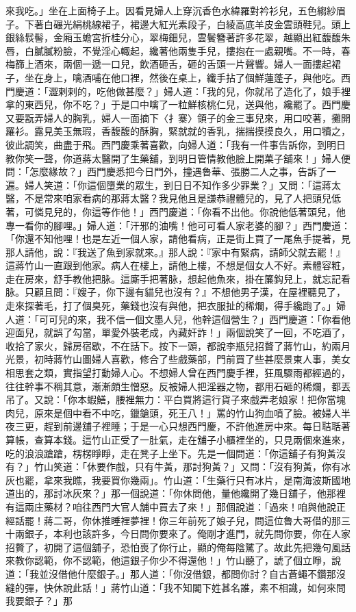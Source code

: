 來我吃。」坐在上面椅子上。因看見婦人上穿沉香色水緯羅對衿衫兒，五色縐紗眉子。下著白碾光絹桃線裙子，裙邊大紅光素段子，白綾高底羊皮金雲頭鞋兒。頭上銀絲䯼髻，金廂玉蟾宮折桂分心，翠梅鈿兒，雲鬢簪著許多花翠，越顯出紅馥馥朱唇，白膩膩粉臉，不覺淫心輙起，纔著他兩隻手兒，摟抱在一處親嘴。不一時，春梅篩上酒來，兩個一遞一口兒，飲酒砸舌，砸的舌頭一片聲響。婦人一面摟起裙子，坐在身上，噙酒哺在他口裡，然後在桌上，纖手拈了個鮮蓮蓬子，與他吃。西門慶道：「澀剌剌的，吃他做甚麼？」婦人道：「我的兒，你就吊了造化了，娘手裡拿的東西兒，你不吃？」于是口中噙了一粒鮮核桃仁兒，送與他，纔罷了。西門慶又要翫弄婦人的胸乳，婦人一面摘下〈扌寨〉領子的金三事兒來，用口咬著，攤開羅衫。露見美玉無瑕，香馥馥的酥胸，緊就就的香乳，揣揣摸摸良久，用口犢之，彼此調笑，曲盡于飛。西門慶乘著喜歡，向婦人道：「我有一件事告訴你，到明日教你笑一聲，你道蔣太醫開了生藥舖，到明日管情教他臉上開菓子舖來！」婦人便問：「怎麼緣故？」西門慶悉把今日門外，撞遇魯華、張勝二人之事，告訴了一遍。婦人笑道：「你這個墮業的眾生，到日日不知作多少罪業？」又問：「這蔣太醫，不是常來咱家看病的那蔣太醫？我見他且是謙恭禮體兒的，見了人把頭兒低著，可憐見兒的，你這等作他！」西門慶道：「你看不出他。你說他低著頭兒，他專一看你的腳哩。」婦人道：「汗邪的油嘴！他可可看人家老婆的腳？」西門慶道：「你還不知他哩！也是左近一個人家，請他看病，正是街上買了一尾魚手提著，見那人請他，說：『我送了魚到家就來。』那人說：『家中有緊病，請師父就去罷！』這蔣竹山一直跟到他家。病人在樓上，請他上樓，不想是個女人不好。素體容粧，走在房來，舒手教他把脉。這廝手把著脉，想起他魚來，掛在簾鈎兒上，就忘記看脉。只顧且問：『嫂子，你下邊有貓兒也沒有？』不想他男子漢，在屋裡聽見了，走來探著毛，打了個臭死，藥錢也沒有與他，把衣服扯的稀爛，得手纔跑了。」婦人道：「可可兒的來，我不信一個文墨人兒，他幹這個營生？」西門慶道：「你看他迎面兒，就誤了勾當，單愛外裝老成，內藏奸詐！」兩個說笑了一回，不吃酒了，收拾了家火，歸房宿歇，不在話下。按下一頭，都說李瓶兒招贅了蔣竹山，約兩月光景，初時蔣竹山圖婦人喜歡，修合了些戲藥部，門前買了些甚麼景東人事，美女相思套之類，實指望打動婦人心。不想婦人曾在西門慶手裡，狂風驟雨都經過的，往往幹事不稱其意，漸漸頗生憎惡。反被婦人把淫器之物，都用石砸的稀爛，都丟吊了。又說：「你本蝦鱔，腰裡無力：平白買將這行貨子來戲弄老娘家！把你當塊肉兒，原來是個中看不中吃，鑞鎗頭，死王八！」罵的竹山狗血噴了臉。被婦人半夜三更，趕到前邊舖子裡睡；于是一心只想西門慶，不許他進房中來。每日聐聒著算帳，查算本錢。這竹山正受了一肚氣，走在舖子小櫃裡坐的，只見兩個來進來，吃的浪浪蹌蹌，楞楞睜睜，走在凳子上坐下。先是一個問道：「你這舖子有狗黃沒有？」竹山笑道：「休要作戲，只有牛黃，那討狗黃？」又問：「沒有狗黃，你有冰灰也罷，拿來我瞧，我要買你幾兩」。竹山道：「生藥行只有冰片，是南海波斯國地道出的，那討冰灰來？」那一個說道：「你休問他，量他纔開了幾日舖子，他那裡有這兩庄藥材？咱往西門大官人舖中買去了來！」那個說道：「過來！咱與他說正經話罷！蔣二哥，你休推睡裡夢裡！你三年前死了娘子兒，問這位魯大哥借的那三十兩銀子，本利也該許多，今日問你要來了。俺剛才進門，就先問你要，你在人家招贅了，初開了這個舖子，恐怕喪了你行止，顯的俺每陰騭了。故此先把幾句風話來教你認範，你不認範，他這銀子你少不得還他！」竹山聽了，諕了個立睜，說道：「我並沒借他什麼銀子。」那人道：「你沒借銀，都問你討？自古蒼蠅不鑽那沒縫的彈，快休說此話！」蔣竹山道：「我不知閣下姓甚名誰，素不相識，如何來問我要銀子？」那